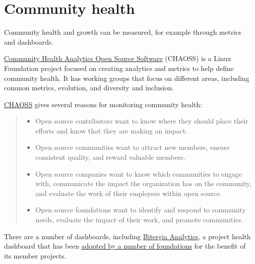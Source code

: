 


\chapter{Community health}

Community health and growth can be measured, for example through metrics and dashboards.

\href{https://chaoss.community/}{Community Health Analytics Open Source Software} (CHAOSS) is a Linux Foundation project focused on creating analytics and metrics to help define community health.  It has working groups that focus on different areas, including common metrics, evolution, and diversity and inclusion.

\begin{kaobox}[frametitle=CHAOSS: the importance of community health]

\href{https://chaoss.community/about/}{CHAOSS} gives several reasons for monitoring community health:

\begin{quote}

\begin{itemize}

\item Open source contributors want to know where they should place their efforts and know that they are making an impact.
\item Open source communities want to attract new members, ensure consistent quality, and reward valuable members.
\item Open source companies want to know which communities to engage with, communicate the impact the organization has on the community, and evaluate the work of their employees within open source.
\item Open source foundations want to identify and respond to community needs, evaluate the impact of their work, and promote communities.

\end{itemize}

\end{quote}

\end{kaobox}

There are a number of dashboards, including \href{https://bitergia.com/bitergia-analytics/}{Bitergia Analytics}, a project health dashboard that has been \href{https://bitergia.com/oss-foundations/}{adopted by a number of foundations} for the benefit of its member projects.

